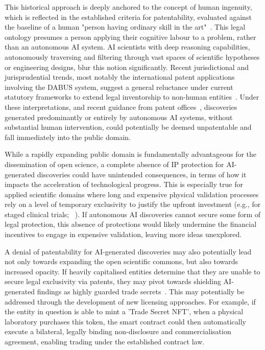 \documentclass[11pt, a4paper, twocolumn, goog]{google}
\begin{document}
This historical approach is deeply anchored to the concept of human ingenuity, which is reflected in the established criteria for patentability, evaluated against the baseline of a human "person having ordinary skill in the art"~\citep{tresansky1991phosita, eisenberg2004obvious}. This legal ontology presumes a person applying their cognitive labour to a problem, rather than an autonomous AI system. AI scientists with deep reasoning capabilities, autonomously traversing and filtering through vast spaces of scientific hypotheses or engineering designs, blur this notion significantly. Recent jurisdictional and jurisprudential trends, most notably the international patent applications involving the DABUS system, suggest a general reluctance under current statutory frameworks to extend legal inventorship to non-human entities~\citep{abbott2020reasonable, lavrichenko2022thaler, selvadurai2025inventions}. Under these interpretations, and recent guidance from patent offices~\citep{kim2024inventorship}, discoveries generated predominantly or entirely by autonomous AI systems, without substantial human intervention, could potentially be deemed unpatentable and fall immediately into the public domain.

While a rapidly expanding public domain is fundamentally advantageous for the dissemination of open science, a complete absence of IP protection for AI-generated discoveries could have unintended consequences, in terms of how it impacts the acceleration of technological progress. This is especially true for applied scientific domains where long and expensive physical validation processes rely on a level of temporary exclusivity to justify the upfront investment (e.g., for staged clinical trials; ~\citealt{grabowski2007generic}). If autonomous AI discoveries cannot secure some form of legal protection, this absence of protections would likely undermine the financial incentives to engage in expensive validation, leaving more ideas unexplored.

A denial of patentability for AI-generated discoveries may also potentially lead not only towards expanding the open scientific commons, but also towards increased opacity. If heavily capitalised entities determine that they are unable to secure legal exclusivity via patents, they may pivot towards shielding AI-generated findings as highly guarded trade secrets~\citep{lemley2011surprising, levine2018startups}. This may potentially be addressed through the development of new licensing approaches. For example, if the entity in question is able to mint a 'Trade Secret NFT', when a physical laboratory purchases this token, the smart contract could then automatically execute a bilateral, legally binding non-disclosure and commercialisation agreement, enabling trading under the established contract law.
\end{document}
